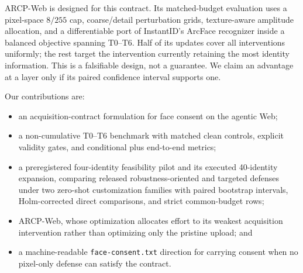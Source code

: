 ARCP-Web is designed for this contract. Its matched-budget evaluation uses a
pixel-space $8/255$ cap, coarse/detail perturbation grids, texture-aware
amplitude allocation, and a differentiable port of InstantID's ArcFace
recognizer inside a balanced objective spanning T0--T6. Half of its updates
cover all interventions uniformly; the rest target the intervention currently
retaining the most identity information. This is a falsifiable design, not a
guarantee. We claim an advantage at a layer only if its paired confidence
interval supports one.

Our contributions are:
\begin{itemize}[leftmargin=*,itemsep=1pt,topsep=2pt]
  \item an acquisition-contract formulation for face consent on the agentic Web;
  \item a non-cumulative T0--T6 benchmark with matched clean controls, explicit
  validity gates, and conditional plus end-to-end metrics;
  \item a preregistered four-identity feasibility pilot and its executed
  40-identity expansion, comparing released robustness-oriented and targeted
  defenses under two zero-shot customization families with paired bootstrap
  intervals, Holm-corrected direct comparisons, and strict common-budget rows;
  \item ARCP-Web, whose optimization allocates effort to its weakest acquisition
  intervention rather than optimizing only the pristine upload; and
  \item a machine-readable \texttt{face-consent.txt} direction for carrying
  consent when no pixel-only defense can satisfy the contract.
\end{itemize}
